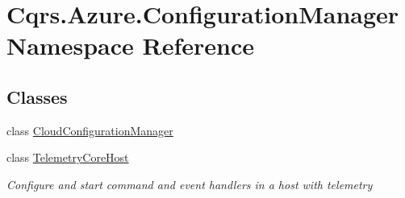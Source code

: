 \hypertarget{namespaceCqrs_1_1Azure_1_1ConfigurationManager}{}\section{Cqrs.\+Azure.\+Configuration\+Manager Namespace Reference}
\label{namespaceCqrs_1_1Azure_1_1ConfigurationManager}
\subsection*{Classes}
\begin{DoxyCompactItemize}
\item 
class \hyperlink{classCqrs_1_1Azure_1_1ConfigurationManager_1_1CloudConfigurationManager}{Cloud\+Configuration\+Manager}
\item 
class \hyperlink{classCqrs_1_1Azure_1_1ConfigurationManager_1_1TelemetryCoreHost}{Telemetry\+Core\+Host}
\begin{DoxyCompactList}\small\item\em Configure and start command and event handlers in a host with telemetry \end{DoxyCompactList}\end{DoxyCompactItemize}
